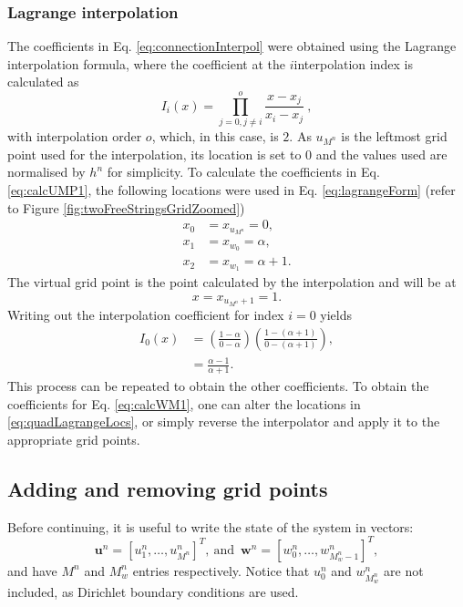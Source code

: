 \subsubsection{Lagrange interpolation}
The coefficients in Eq. \eqref{eq:connectionInterpol} were obtained using the Lagrange interpolation formula, where the coefficient at the $i$\th interpolation index is calculated as
\begin{equation}\label{eq:lagrangeForm}
    I_i(x) = \prod_{j = 0, j\neq i}^o \frac{x-x_j}{x_i-x_j}\ ,
\end{equation}
with interpolation order $o$, which, in this case, is $2$. As $u_{M^n}$ is the leftmost grid point used for the interpolation, its location is set to $0$ and the values used are normalised by $h^n$ for simplicity. To calculate the coefficients in Eq. \eqref{eq:calcUMP1}, the following locations were used in Eq. \eqref{eq:lagrangeForm} (refer to Figure \ref{fig:twoFreeStringsGridZoomed})
\begin{equation}\label{eq:quadLagrangeLocs}
    \begin{aligned}
     x_0 &= x_{u_{M^n}} = 0, \\
     x_1 &= x_{w_0} = \alpha, \\
     x_2& = x_{w_1} = \alpha + 1.
    \end{aligned}
\end{equation}
The virtual grid point is the point calculated by the interpolation and will be at
\begin{equation}
    x = x_{u_{M^n}+1} = 1.
\end{equation}
Writing out the interpolation coefficient for index $i=0$ yields
\begin{align*}
    I_0(x)&= \left(\frac{1-\alpha}{0-\alpha}\right)\left(\frac{1-(\alpha+1)}{0-(\alpha+1)}\right), \\
    &=\frac{\alpha-1}{\alpha+1}.
\end{align*}
This process can be repeated to obtain the other coefficients. To obtain the coefficients for Eq. \eqref{eq:calcWM1}, one can alter the locations in \eqref{eq:quadLagrangeLocs}, or simply reverse the interpolator and apply it to the appropriate grid points. 


\subsection{Adding and removing grid points}\label{sec:addRemove}
Before continuing, it is useful to write the state of the system in vectors:
\begin{equation}
    \label{eq:separateStateVectors}
     \mathbf{u}^n = [u_1^n, \hdots, u_{M^n}^n]^T\!, \  \text{and} \ \; \mathbf{w}^n = [w_0^n, \hdots, w_{M_w^n-1}^n]^T,
\end{equation}
and have $M^n$ and $M_w^n$ entries respectively. Notice that $u_0^n$ and $w_{M_w^n}^n$ are not included, as Dirichlet boundary conditions are used.


